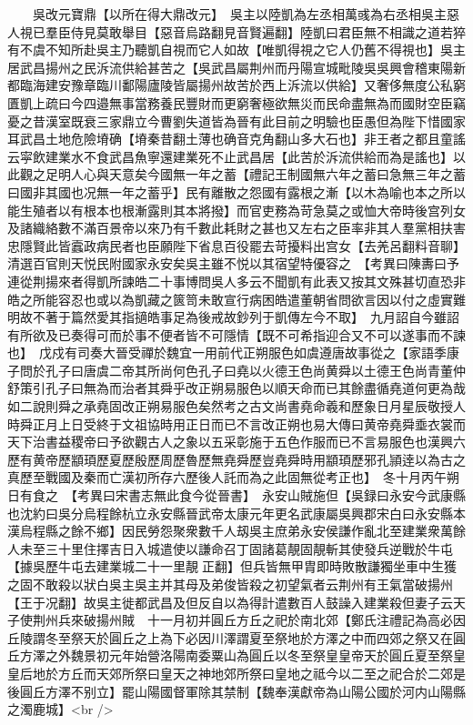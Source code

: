 　　吳改元寶鼎【以所在得大鼎改元】　吳主以陸凱為左丞相萬彧為右丞相吳主惡人視已羣臣侍見莫敢舉目【惡音烏路翻見音賢遍翻】陸凱曰君臣無不相識之道若猝有不虞不知所赴吳主乃聽凱自視而它人如故【唯凱得視之它人仍舊不得視也】吳主居武昌揚州之民泝流供給甚苦之【吳武昌屬荆州而丹陽宣城毗陵吳吳興會稽東陽新都臨海建安豫章臨川鄱陽廬陵皆屬揚州故苦於西上泝流以供給】又奢侈無度公私窮匱凱上疏曰今四邉無事當務養民豐財而更窮奢極欲無災而民命盡無為而國財空臣竊憂之昔漢室既衰三家鼎立今曹劉失道皆為晉有此目前之明驗也臣愚但為陛下惜國家耳武昌土地危險塉确【塉秦昔翻土薄也确音克角翻山多大石也】非王者之都且童謠云寜飲建業水不食武昌魚寧還建業死不止武昌居【此苦於泝流供給而為是謠也】以此觀之足明人心與天意矣今國無一年之蓄【禮記王制國無六年之蓄曰急無三年之蓄曰國非其國也况無一年之蓄乎】民有離散之怨國有露根之漸【以木為喻也本之所以能生殖者以有根本也根漸露則其本將撥】而官吏務為苛急莫之或恤大帝時後宫列女及諸織絡數不滿百景帝以來乃有千數此耗財之甚也又左右之臣率非其人羣黨相扶害忠隱賢此皆蠧政病民者也臣願陛下省息百役罷去苛擾料出宫女【去羌呂翻料音聊】清選百官則天悦民附國家永安矣吳主雖不悦以其宿望特優容之　【考異曰陳夀曰予連從荆揚來者得凱所諫皓二十事博問吳人多云不聞凱有此表又按其文殊甚切直恐非皓之所能容忍也或以為凱藏之篋笥未敢宣行病困皓遣董朝省問欲言因以付之虛實難明故不著于篇然愛其指擿皓事足為後戒故鈔列于凱傳左今不取】　九月詔自今雖詔有所欲及已奏得可而於事不便者皆不可隱情【既不可希指迎合又不可以遂事而不諫也】　戊戍有司奏大晉受禪於魏宜一用前代正朔服色如虞遵唐故事從之【家語季康子問於孔子曰唐虞二帝其所尚何色孔子曰堯以火德王色尚黄舜以土德王色尚青董仲舒策引孔子曰無為而治者其舜乎改正朔易服色以順天命而已其餘盡循堯道何更為哉如二說則舜之承堯固改正朔易服色矣然考之古文尚書堯命羲和歷象日月星辰敬授人時舜正月上日受終于文祖協時用正日而已不言改正朔也易大傳曰黄帝堯舜埀衣裳而天下治書益稷帝曰予欲觀古人之象以五采彰施于五色作服而已不言易服色也漢興六歷有黄帝歷顓頊歷夏歷殷歷周歷魯歷無堯舜歷豈堯舜時用顓頊歷邪孔頴逹以為古之真歷至戰國及秦而亡漢初所存六歷後人託而為之此固無從考正也】　冬十月丙午朔日有食之　【考異曰宋書志無此食今從晉書】　永安山賊施但【吳録曰永安今武康縣也沈約曰吳分烏程餘杭立永安縣晉武帝太康元年更名武康屬吳興郡宋白曰永安縣本漢烏程縣之餘不鄉】因民勞怨聚衆數千人刼吳主庶弟永安侯謙作亂北至建業衆萬餘人未至三十里住擇吉日入城遣使以謙命召丁固諸葛靚固靚斬其使發兵逆戰於牛屯【據吳歷牛屯去建業城二十一里靚正翻】但兵皆無甲胄即時敗散謙獨坐車中生獲之固不敢殺以狀白吳主吳主并其母及弟俊皆殺之初望氣者云荆州有王氣當破揚州【王于况翻】故吳主徙都武昌及但反自以為得計遣數百人鼓譟入建業殺但妻子云天子使荆州兵來破揚州賊　十一月初并圓丘方丘之祀於南北郊【鄭氏注禮記為高必因丘陵謂冬至祭天於圓丘之上為下必因川澤謂夏至祭地於方澤之中而四郊之祭又在圓丘方澤之外魏景初元年始營洛陽南委粟山為圓丘以冬至祭皇皇帝天於圓丘夏至祭皇皇后地於方丘而天郊所祭曰皇天之神地郊所祭曰皇地之祗今以二至之祀合於二郊是後圓丘方澤不别立】罷山陽國督軍除其禁制【魏奉漢獻帝為山陽公國於河内山陽縣之濁鹿城】<br />
